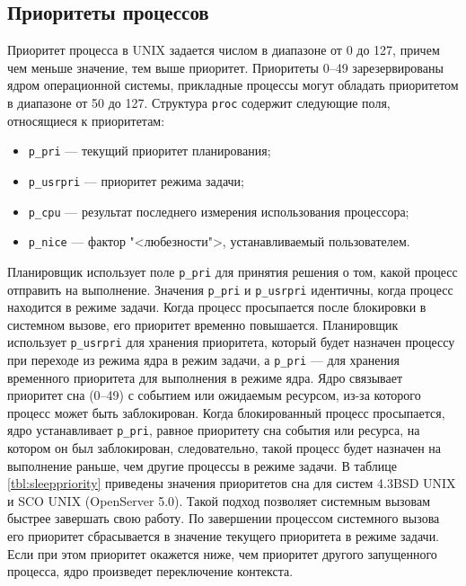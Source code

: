 \documentclass[a4paper,oneside,14pt]{extreport}
\newcommand{\code}[1]{\texttt{#1}}
\begin{document}
	\subsection{Приоритеты процессов}
	Приоритет процесса в UNIX задается числом в диапазоне от 0 до 127, причем чем меньше значение, тем выше приоритет. Приоритеты 0--49 зарезервированы ядром операционной системы, прикладные процессы могут обладать приоритетом в диапазоне от 50 до 127.
	Структура \code{proc} содержит следующие поля, относящиеся к приоритетам:
	\begin{itemize}
		\item \code{p{\_}pri} --- текущий приоритет планирования;
		\item \code{p{\_}usrpri} --- приоритет режима задачи;
		\item \code{p{\_}cpu} --- результат последнего измерения использования процессора;
		\item \code{p{\_}nice} --- фактор "<любезности">, устанавливаемый пользователем.
	\end{itemize}
	Планировщик использует поле \code{p{\_}pri} для принятия решения о том, какой процесс отправить на выполнение. Значения \code{p{\_}pri} и \code{p{\_}usrpri} идентичны, когда процесс находится в режиме задачи. Когда процесс просыпается после блокировки в системном вызове, его приоритет временно повышается. Планировщик использует \code{p{\_}usrpri} для хранения приоритета, который будет назначен процессу при переходе из режима ядра в режим задачи, а \code{p{\_}pri} --- для хранения временного приоритета для выполнения в режиме ядра.
	Ядро связывает приоритет сна (0--49) с событием или ожидаемым ресурсом, из-за которого процесс может быть заблокирован. Когда блокированный процесс просыпается, ядро устанавливает \code{p{\_}pri}, равное приоритету сна события или ресурса, на котором он был заблокирован, следовательно, такой процесс будет назначен на выполнение раньше, чем другие процессы в режиме задачи. В таблице \ref{tbl:sleeppriority} приведены значения приоритетов сна для систем 4.3BSD UNIX и SCO UNIX (OpenServer 5.0). Такой подход позволяет системным вызовам быстрее завершать свою работу. По завершении процессом системного вызова его приоритет сбрасывается в значение текущего приоритета в режиме задачи. Если при этом приоритет окажется ниже, чем приоритет другого запущенного процесса, ядро произведет переключение контекста.
\end{document}
